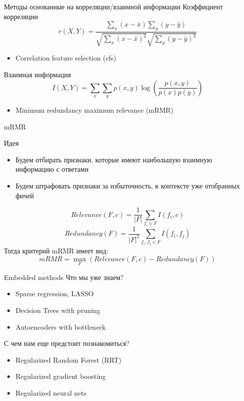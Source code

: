 \documentclass[10pt]{beamer}
\begin{document}
\begin{frame}{Методы основанные на корреляции/взаимной информации}
Коэффициент корреляции
\[
    r(X,Y) = \frac{\sum \limits _x (x - \bar{x}) \sum \limits _y (y -
    \bar{y})}{\sqrt{ \sum \limits _x (x - \bar{x})^2  } \sqrt{ \sum \limits _y
(y - \bar{y})^2  } }
\]
\begin{itemize}
    \item Correlation feature selection (cfs)
\end{itemize}

\vspace{1em}
Взаимная информация
\[
    I(X,Y) = \sum \limits _x \sum \limits _y p(x,y) \log \left(
    \frac{p(x,y)}{p(x)p(y)} \right)
\]
\begin{itemize}
    \item Minimum redundancy maximum relevance (mRMR)
\end{itemize}
\end{frame}

\begin{frame}{mRMR}
\begin{block}{Идея}
\begin{itemize}
\item Будем отбирать признаки, которые имеют наибольшую взаимную информацию с
    ответами
\item Будем штрафовать признаки за избыточность, в контексте уже отобранных
    фичей
\end{itemize}
\end{block}
\[
    Relevance(F, c) = \frac{1}{|F|} \sum \limits _{f_i \in F} I(f_i, c) 
\]
\[
    Redundancy(F) = \frac{1}{|F|^2} \sum \limits _{f_i, f_j \in F} I(f_i, f_j)
\]
Тогда критерий mRMR имеет вид:
\[
    mRMR = \max \limits _F (Relevance(F, c) - Redundancy(F))
\]
\end{frame}

\begin{frame}{Embedded methods}
Что мы уже знаем?
\begin{itemize}
    \item Sparse regression, LASSO
    \item Decision Trees with pruning
    \item Autoencoders with bottleneck
\end{itemize}

\vspace{1em}
С чем нам еще предстоит познакомиться?
\begin{itemize}
    \item Regularized Random Forest (RRT)
    \item Regularized gradient boosting
    \item Regularized neural nets
\end{itemize}
\end{frame}
\end{document}
